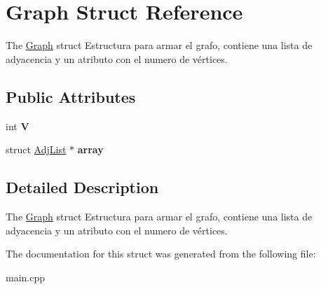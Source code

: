 \hypertarget{struct_graph}{}\section{Graph Struct Reference}
\label{struct_graph}


The \hyperlink{struct_graph}{Graph} struct Estructura para armar el grafo, contiene una lista de adyacencia y un atributo con el numero de vértices.  


\subsection*{Public Attributes}
\begin{DoxyCompactItemize}
\item 
\mbox{\label{struct_graph_a2b722f7cfa7a21e4cb5fae488b3d4dcc}} 
int {\bfseries V}
\item 
\mbox{\label{struct_graph_a33138cfe84bb21a940ad2aa9a1a8c9eb}} 
struct \hyperlink{struct_adj_list}{Adj\+List} $\ast$ {\bfseries array}
\end{DoxyCompactItemize}


\subsection{Detailed Description}
The \hyperlink{struct_graph}{Graph} struct Estructura para armar el grafo, contiene una lista de adyacencia y un atributo con el numero de vértices. 

The documentation for this struct was generated from the following file\+:\begin{DoxyCompactItemize}
\item 
main.\+cpp\end{DoxyCompactItemize}
